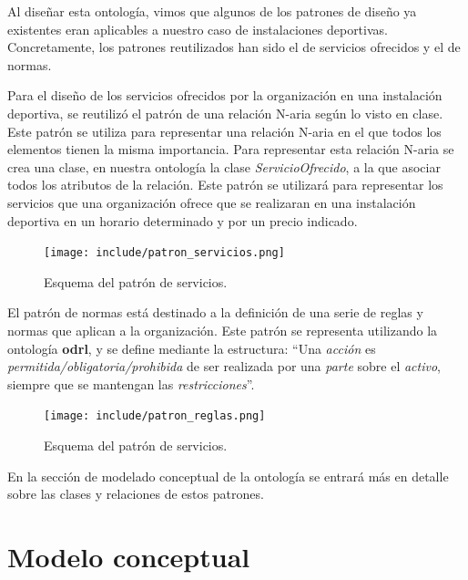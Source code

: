 \documentclass[a4paper,12pt]{article}
\begin{document}
	Al diseñar esta ontología, vimos que algunos de los patrones de diseño ya existentes eran aplicables a nuestro caso de instalaciones deportivas. Concretamente, los patrones reutilizados han sido el de servicios ofrecidos y el de normas.
	
	Para el diseño de los servicios ofrecidos por la organización en una instalación deportiva, se reutilizó el patrón de una relación N-aria según lo visto en clase. Este patrón se utiliza para representar una relación N-aria en el que todos los elementos tienen la misma importancia. Para representar esta relación N-aria se crea una clase, en nuestra ontología la clase \textit{ServicioOfrecido}, a la que asociar todos los atributos de la relación. Este patrón se utilizará para representar los servicios que una organización ofrece que se realizaran en una instalación deportiva en un horario determinado y por un precio indicado.
	
	\begin{figure}[H]
		\centering
		\texttt{[image: include/patron\_servicios.png]}
		\caption{Esquema del patrón de servicios.}
	\end{figure}

	El patrón de normas está destinado a la definición de una serie de reglas y normas que aplican a la organización. Este patrón se representa utilizando la ontología \textbf{odrl}, y se define mediante la estructura: “Una \textit{acción} es \textit{permitida/obligatoria/prohibida} de ser realizada por una \textit{parte} sobre el \textit{activo}, siempre que se mantengan las \textit{restricciones}”.
	
	\begin{figure}[H]
		\centering
		\texttt{[image: include/patron\_reglas.png]}
		\caption{Esquema del patrón de servicios.}
	\end{figure}
	
	En la sección de modelado conceptual de la ontología se entrará más en detalle sobre las clases y relaciones de estos patrones.
	
	\section{Modelo conceptual}
	
\end{document}
